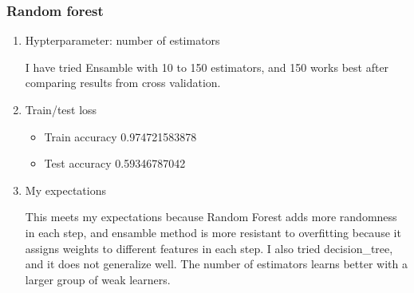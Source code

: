 \documentclass[letterpaper, 12]{article}
\begin{document}
\subsubsection{Random forest}
\begin{enumerate}

    \item Hypterparameter: number of estimators
	
	I have tried Ensamble with 10 to 150 estimators, and 150 works best after comparing results from cross validation.

	\item Train/test loss
	\begin{itemize}
     \item  Train accuracy 0.974721583878
     \item Test accuracy 0.59346787042
        \end{itemize}
      \item My expectations
      
      This meets my expectations because Random Forest adds more randomness in each step, and ensamble method is more resistant to overfitting because it assigns weights to different features in each step. I also tried decision\_tree, and it does not generalize well.
      The number of estimators learns better with a larger group of weak learners.
  
\end{enumerate}
\end{document}
